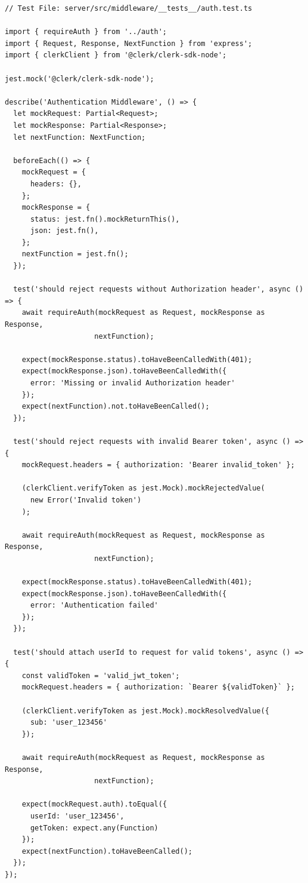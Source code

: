 \begin{verbatim}
// Test File: server/src/middleware/__tests__/auth.test.ts

import { requireAuth } from '../auth';
import { Request, Response, NextFunction } from 'express';
import { clerkClient } from '@clerk/clerk-sdk-node';

jest.mock('@clerk/clerk-sdk-node');

describe('Authentication Middleware', () => {
  let mockRequest: Partial<Request>;
  let mockResponse: Partial<Response>;
  let nextFunction: NextFunction;

  beforeEach(() => {
    mockRequest = {
      headers: {},
    };
    mockResponse = {
      status: jest.fn().mockReturnThis(),
      json: jest.fn(),
    };
    nextFunction = jest.fn();
  });

  test('should reject requests without Authorization header', async () => {
    await requireAuth(mockRequest as Request, mockResponse as Response, 
                     nextFunction);
    
    expect(mockResponse.status).toHaveBeenCalledWith(401);
    expect(mockResponse.json).toHaveBeenCalledWith({
      error: 'Missing or invalid Authorization header'
    });
    expect(nextFunction).not.toHaveBeenCalled();
  });

  test('should reject requests with invalid Bearer token', async () => {
    mockRequest.headers = { authorization: 'Bearer invalid_token' };
    
    (clerkClient.verifyToken as jest.Mock).mockRejectedValue(
      new Error('Invalid token')
    );
    
    await requireAuth(mockRequest as Request, mockResponse as Response, 
                     nextFunction);
    
    expect(mockResponse.status).toHaveBeenCalledWith(401);
    expect(mockResponse.json).toHaveBeenCalledWith({
      error: 'Authentication failed'
    });
  });

  test('should attach userId to request for valid tokens', async () => {
    const validToken = 'valid_jwt_token';
    mockRequest.headers = { authorization: `Bearer ${validToken}` };
    
    (clerkClient.verifyToken as jest.Mock).mockResolvedValue({
      sub: 'user_123456'
    });
    
    await requireAuth(mockRequest as Request, mockResponse as Response, 
                     nextFunction);
    
    expect(mockRequest.auth).toEqual({
      userId: 'user_123456',
      getToken: expect.any(Function)
    });
    expect(nextFunction).toHaveBeenCalled();
  });
});
\end{verbatim}

